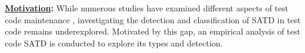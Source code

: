\begin{tcolorbox}
\noindent\textbf{\underline{Motivation}:}
While numerous studies have examined different aspects of test code maintenance \cite{spadini_relation_2018, lin_quality_2019, beller_developer_2019, beller_when_2015, zaidman_studying_2011, athanasiou_test_2014}, investigating the detection and classification of SATD in test code remains underexplored. Motivated by this gap, an empirical analysis of test code SATD is conducted to explore its types and detection.
\end{tcolorbox}






